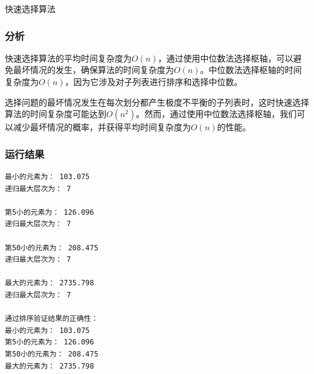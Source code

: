 \documentclass[lang=cn,11pt,a4paper]{elegantpaper}
\begin{document}
\begin{algorithm}
\caption{快速选择算法}\label{alg:quickselect}
\begin{algorithmic}
   
   
   
     
     
  \Else
     
  \EndIf
\EndFunction

   
  
   
    \EndWhile
    
    \EndWhile
    
    \EndIf
    
  \EndWhile
  
   
\EndFunction
\end{algorithmic}
\end{algorithm}


\subsubsection{分析}
快速选择算法的平均时间复杂度为$O(n)$，通过使用中位数法选择枢轴，可以避免最坏情况的发生，确保算法的时间复杂度为$O(n)$。中位数法选择枢轴的时间复杂度为$O(n)$，因为它涉及对子列表进行排序和选择中位数。

选择问题的最坏情况发生在每次划分都产生极度不平衡的子列表时，这时快速选择算法的时间复杂度可能达到$O(n^2)$。然而，通过使用中位数法选择枢轴，我们可以减少最坏情况的概率，并获得平均时间复杂度为$O(n)$的性能。

\subsubsection{运行结果}
\begin{lstlisting}[language=text]
最小的元素为： 103.075
递归最大层次为： 7 

第5小的元素为： 126.096
递归最大层次为： 7 

第50小的元素为： 208.475
递归最大层次为： 7 

最大的元素为： 2735.798
递归最大层次为： 7 

通过排序验证结果的正确性：
最小的元素为： 103.075
第5小的元素为： 126.096
第50小的元素为： 208.475
最大的元素为： 2735.798
\end{lstlisting}
\end{document}
